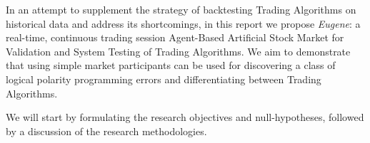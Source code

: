 In an attempt to supplement the strategy of backtesting Trading Algorithms on historical data and address its shortcomings, in this report we propose \emph{Eugene}: a real-time, continuous trading session Agent-Based Artificial Stock Market for Validation and System Testing of Trading Algorithms. We aim to demonstrate that using simple market participants can be used for discovering a class of logical polarity programming errors and differentiating between Trading Algorithms.

We will start by formulating the research objectives and null-hypotheses, followed by a discussion of the research methodologies.





